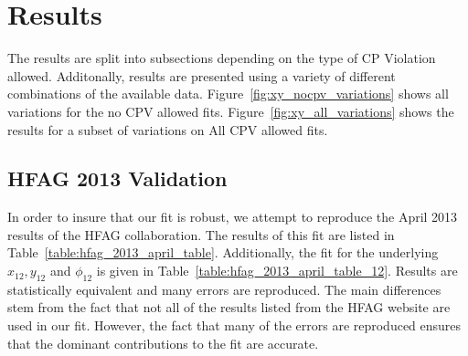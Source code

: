 \section{Results}
\label{sec:Results}
The results are split into subsections depending on the type of CP Violation allowed.
Additonally, results are presented using a variety of different combinations of the
available data. Figure~\ref{fig:xy_nocpv_variations} shows all variations for the 
no CPV allowed fits. Figure~\ref{fig:xy_all_variations} shows the results for a 
subset of variations on All CPV allowed fits. 
\subsection{HFAG 2013 Validation}
In order to insure that our fit is robust, we attempt to reproduce the April 2013 results
of the HFAG collaboration\cite{HFAG}. The results of this fit are listed in Table~\ref{table:hfag_2013_april_table}. 
Additionally, the fit for the underlying $x_{12},y_{12}$ and $\phi_{12}$ is given in Table~\ref{table:hfag_2013_april_table_12}. 
Results are statistically equivalent and many errors are reproduced. The main differences 
stem from the fact that not all of the results listed from the HFAG website\cite{HFAG} are 
used in our fit. However, the fact that many of the errors are reproduced ensures that 
the dominant contributions to the fit are accurate.

